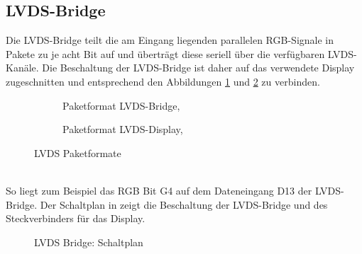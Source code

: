 \subsection{LVDS-Bridge}
Die LVDS-Bridge teilt die am Eingang liegenden parallelen RGB-Signale in Pakete zu je acht Bit auf und überträgt diese seriell über die verfügbaren LVDS-Kanäle. Die Beschaltung der LVDS-Bridge ist daher auf das verwendete Display  zugeschnitten und entsprechend den Abbildungen \ref{fig:teilb_lvds_bridge_format} und \ref{fig:teilb_lvds_display_format} zu verbinden.
\begin{figure}[htbp]
        \begin{center}
        \begin{subfigure}[htp]{0.48\textwidth}
 			\caption{Paketformat LVDS-Bridge, \cite{TI2011b}}
            \label{fig:teilb_lvds_bridge_format}
        \end{subfigure}
        \quad
        \begin{subfigure}[htp]{0.48\textwidth}
            \caption{Paketformat LVDS-Display, \cite{LG2012}}
            \label{fig:teilb_lvds_display_format}
        \end{subfigure}
		\end{center}
        \caption{LVDS Paketformate}
        \label{fig:teilb_lvds_format}
\end{figure} \\
So liegt zum Beispiel das RGB Bit G4 auf dem Dateneingang D13 der LVDS-Bridge. Der Schaltplan in  zeigt die Beschaltung der LVDS-Bridge und des Steckverbinders für das Display.\\
\begin{figure}[htbp]
		\center
        \caption{LVDS Bridge: Schaltplan}
       \label{fig:teilb_lvds_bridge_sch}
\end{figure}\\
